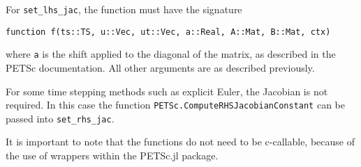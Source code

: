 \documentclass{article}
\begin{document}
For \texttt{set\_lhs\_jac}, the function must have the signature

\begin{verbatim}
function f(ts::TS, u::Vec, ut::Vec, a::Real, A::Mat, B::Mat, ctx)
\end{verbatim}
where \texttt{a} is the shift applied to the diagonal of the matrix, as 
described in the PETSc documentation.  All other arguments are as described
previously.

For some time stepping methods such as explicit Euler, the Jacobian is not 
required.  In this case the function \texttt{PETSc.ComputeRHSJacobianConstant}
can be passed into \texttt{set\_rhs\_jac}.

It is important to note that the functions do not need to be c-callable, 
because of the use of wrappers within the PETSc.jl package.
\end{document}
